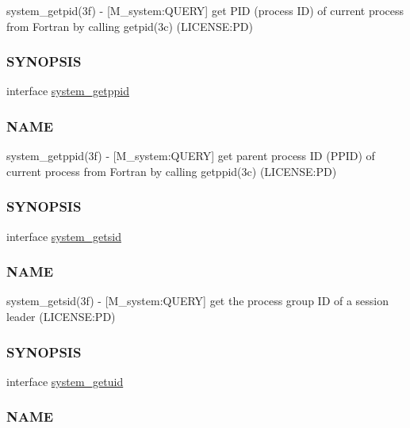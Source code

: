 \begin{DoxyCompactItemize}
\begin{DoxyCompactList}
system\+\_\+getpid(3f) -\/ \mbox{[}M\+\_\+system\+:Q\+U\+E\+RY\mbox{]} get P\+ID (process ID) of current process from Fortran by calling getpid(3c) (L\+I\+C\+E\+N\+SE\+:PD) \subsubsection*{S\+Y\+N\+O\+P\+S\+IS}\end{DoxyCompactList}\item 
interface \mbox{\hyperlink{interfacem__system_1_1system__getppid}{system\+\_\+getppid}}
\begin{DoxyCompactList}\small\item\em \subsubsection*{N\+A\+ME}

system\+\_\+getppid(3f) -\/ \mbox{[}M\+\_\+system\+:Q\+U\+E\+RY\mbox{]} get parent process ID (P\+P\+ID) of current process from Fortran by calling getppid(3c) (L\+I\+C\+E\+N\+SE\+:PD) \subsubsection*{S\+Y\+N\+O\+P\+S\+IS}\end{DoxyCompactList}\item 
interface \mbox{\hyperlink{interfacem__system_1_1system__getsid}{system\+\_\+getsid}}
\begin{DoxyCompactList}\small\item\em \subsubsection*{N\+A\+ME}

system\+\_\+getsid(3f) -\/ \mbox{[}M\+\_\+system\+:Q\+U\+E\+RY\mbox{]} get the process group ID of a session leader (L\+I\+C\+E\+N\+SE\+:PD) \subsubsection*{S\+Y\+N\+O\+P\+S\+IS}\end{DoxyCompactList}\item 
interface \mbox{\hyperlink{interfacem__system_1_1system__getuid}{system\+\_\+getuid}}
\begin{DoxyCompactList}\small\item\em \subsubsection*{N\+A\+ME}


\end{DoxyCompactList}
\end{DoxyCompactItemize}
